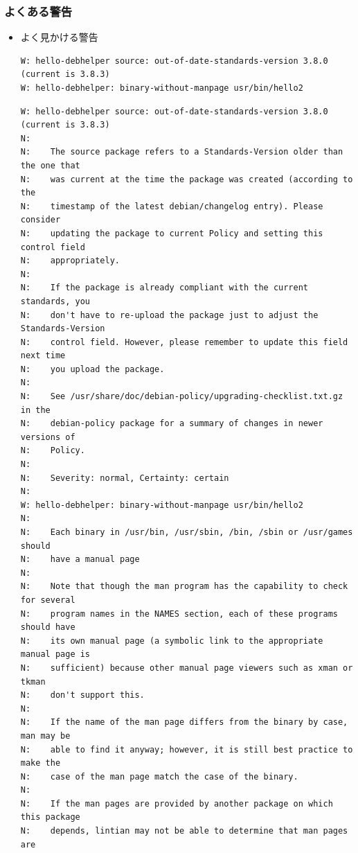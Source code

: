 \documentclass[mingoth,a4paper]{jsarticle}
\begin{document}
\subsubsection{よくある警告}

\begin{itemize}
\item よく見かける警告
  \begin{screen}[5]
  {\footnotesize{}
\begin{verbatim}
W: hello-debhelper source: out-of-date-standards-version 3.8.0 (current is 3.8.3)
W: hello-debhelper: binary-without-manpage usr/bin/hello2
\end{verbatim}
    }
  \end{screen}
  \begin{screen}[5]
    {\footnotesize{}
\begin{verbatim}
W: hello-debhelper source: out-of-date-standards-version 3.8.0 (current is 3.8.3)
N: 
N:    The source package refers to a Standards-Version older than the one that
N:    was current at the time the package was created (according to the
N:    timestamp of the latest debian/changelog entry). Please consider
N:    updating the package to current Policy and setting this control field
N:    appropriately.
N:    
N:    If the package is already compliant with the current standards, you
N:    don't have to re-upload the package just to adjust the Standards-Version
N:    control field. However, please remember to update this field next time
N:    you upload the package.
N:    
N:    See /usr/share/doc/debian-policy/upgrading-checklist.txt.gz in the
N:    debian-policy package for a summary of changes in newer versions of
N:    Policy.
N:    
N:    Severity: normal, Certainty: certain
N: 
W: hello-debhelper: binary-without-manpage usr/bin/hello2
N: 
N:    Each binary in /usr/bin, /usr/sbin, /bin, /sbin or /usr/games should
N:    have a manual page
N:    
N:    Note that though the man program has the capability to check for several
N:    program names in the NAMES section, each of these programs should have
N:    its own manual page (a symbolic link to the appropriate manual page is
N:    sufficient) because other manual page viewers such as xman or tkman
N:    don't support this.
N:    
N:    If the name of the man page differs from the binary by case, man may be
N:    able to find it anyway; however, it is still best practice to make the
N:    case of the man page match the case of the binary.
N:    
N:    If the man pages are provided by another package on which this package
N:    depends, lintian may not be able to determine that man pages are

\end{verbatim}}
\end{screen}
\end{itemize}
\end{document}
